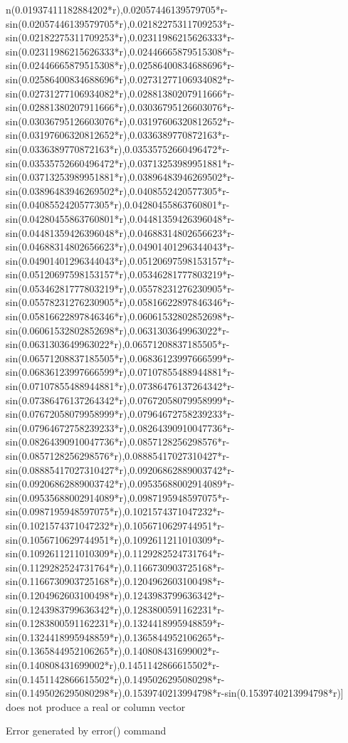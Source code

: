 \documentclass[a4paper,10pt]{article}
\begin{document}
\begin{eulernotebook}
\begin{euleroutput}
n(0.01937411182884202*r),0.02057446139579705*r-sin(0.02057446139579705*r),0.02182275311709253*r-sin(0.02182275311709253*r),0.02311986215626333*r-sin(0.02311986215626333*r),0.02446665879515308*r-sin(0.02446665879515308*r),0.02586400834688696*r-sin(0.02586400834688696*r),0.02731277106934082*r-sin(0.02731277106934082*r),0.02881380207911666*r-sin(0.02881380207911666*r),0.03036795126603076*r-sin(0.03036795126603076*r),0.03197606320812652*r-sin(0.03197606320812652*r),0.0336389770872163*r-sin(0.0336389770872163*r),0.03535752660496472*r-sin(0.03535752660496472*r),0.03713253989951881*r-sin(0.03713253989951881*r),0.03896483946269502*r-sin(0.03896483946269502*r),0.0408552420577305*r-sin(0.0408552420577305*r),0.04280455863760801*r-sin(0.04280455863760801*r),0.04481359426396048*r-sin(0.04481359426396048*r),0.04688314802656623*r-sin(0.04688314802656623*r),0.04901401296344043*r-sin(0.04901401296344043*r),0.05120697598153157*r-sin(0.05120697598153157*r),0.05346281777803219*r-sin(0.05346281777803219*r),0.05578231276230905*r-sin(0.05578231276230905*r),0.05816622897846346*r-sin(0.05816622897846346*r),0.06061532802852698*r-sin(0.06061532802852698*r),0.0631303649963022*r-sin(0.0631303649963022*r),0.06571208837185505*r-sin(0.06571208837185505*r),0.06836123997666599*r-sin(0.06836123997666599*r),0.07107855488944881*r-sin(0.07107855488944881*r),0.07386476137264342*r-sin(0.07386476137264342*r),0.07672058079958999*r-sin(0.07672058079958999*r),0.07964672758239233*r-sin(0.07964672758239233*r),0.08264390910047736*r-sin(0.08264390910047736*r),0.0857128256298576*r-sin(0.0857128256298576*r),0.08885417027310427*r-sin(0.08885417027310427*r),0.09206862889003742*r-sin(0.09206862889003742*r),0.09535688002914089*r-sin(0.09535688002914089*r),0.0987195948597075*r-sin(0.0987195948597075*r),0.1021574371047232*r-sin(0.1021574371047232*r),0.1056710629744951*r-sin(0.1056710629744951*r),0.1092611211010309*r-sin(0.1092611211010309*r),0.1129282524731764*r-sin(0.1129282524731764*r),0.1166730903725168*r-sin(0.1166730903725168*r),0.1204962603100498*r-sin(0.1204962603100498*r),0.1243983799636342*r-sin(0.1243983799636342*r),0.1283800591162231*r-sin(0.1283800591162231*r),0.1324418995948859*r-sin(0.1324418995948859*r),0.1365844952106265*r-sin(0.1365844952106265*r),0.140808431699002*r-sin(0.140808431699002*r),0.1451142866615502*r-sin(0.1451142866615502*r),0.1495026295080298*r-sin(0.1495026295080298*r),0.1539740213994798*r-sin(0.1539740213994798*r)] does not produce a real or column vector
  
  Error generated by error() command
  

\end{euleroutput}
\end{eulernotebook}
\end{document}

